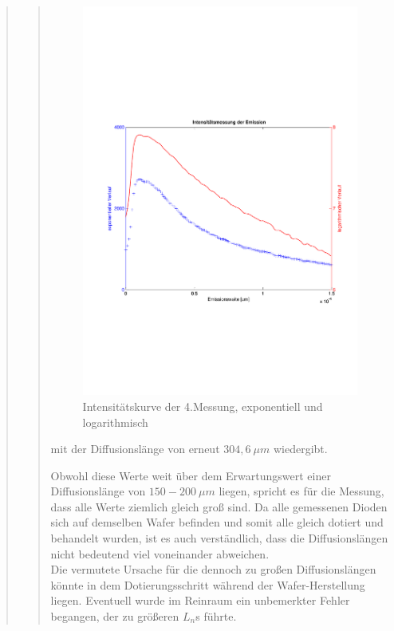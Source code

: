 \begin{quote}
\begin{quote}
        \begin{figure}[H]
                    \centering
                        \includegraphics[scale=0.53, trim = 1cm 6cm 1.5cm 8cm,
                        clip]{./Emissionsbilder/vier/Intensitatsmessung.pdf}
                        \caption{Intensitätskurve der 4.Messung, exponentiell
                        und logarithmisch}
                            \label{fig:./Emissionsbilder/vier/Intensitatsmessung.pdf}
        \end{figure}
        
        mit der Diffusionslänge von erneut $304,6\ \mu m$ wiedergibt.
        
        \vspace{1.5em}
        
        Obwohl diese Werte weit über dem Erwartungswert einer Diffusionslänge
        von $150 - 200\ \mu m$ liegen, spricht es für die Messung, dass alle
        Werte ziemlich gleich groß sind. Da alle gemessenen Dioden sich auf
        demselben Wafer befinden und somit alle gleich dotiert und behandelt wurden, ist
        es auch verständlich, dass die Diffusionslängen nicht bedeutend viel
        voneinander abweichen.\\
        Die vermutete Ursache für die dennoch zu großen Diffusionslängen könnte
        in dem Dotierungsschritt während der Wafer-Herstellung liegen. Eventuell
        wurde im Reinraum ein unbemerkter Fehler begangen, der zu größeren
        $L_n$s führte.
        

\end{quote}
\end{quote}

